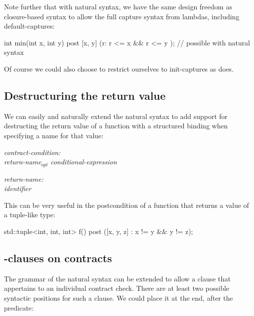 Note further that with natural syntax, we have the same design freedom as closure-based syntax \cite{P2461R1} to allow the full capture syntax from lambdas, including default-captures:

\begin{codeblock}
int min(int x, int y)
  post [x, y] (r: r <= x && r <= y );   // possible with natural syntax
\end{codeblock}

Of course we could also choose to restrict ourselves to init-captures as \cite{P2935R3} does. 


\subsection{Destructuring the return value}
\label{subsec:struct}

We can easily and naturally extend the natural syntax to add support for destructing the return value of a function with a structured binding when specifying a name for that value:

\emph{contract-condition:} \\
\phantom{~~~}\tcode{(} \emph{return-name}$_{opt}$ \emph{conditional-expression} \tcode{)}

\emph{return-name:}\\
\phantom{~~~}\emph{identifier} \tcode{:} \\
\phantom{~~~}

This can be very useful in the postcondition of a function that returns a value of a tuple-like type:

\begin{codeblock}
std::tuple<int, int, int> f()
  post ([x, y, z] : x != y && y != z);
\end{codeblock}



\subsection{-clauses on contracts}
\label{subsec:requires}

The grammar of the natural syntax can be extended to allow a  clause that appertains to an individual contract check. There are at least two possible syntactic positions for such a  clause. We could place it at the end, after the predicate:

